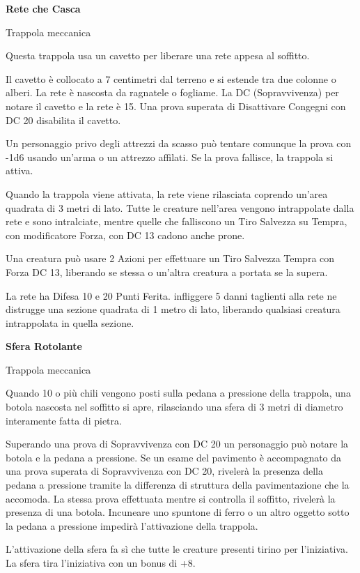 \begin{multicols}{2}
\medskip

\textbf{Rete che Casca}

Trappola meccanica

Questa trappola usa un cavetto per liberare una rete appesa al soffitto.

Il cavetto è collocato a 7 centimetri dal terreno e si estende tra due colonne o alberi. La rete è nascosta da ragnatele o fogliame. La DC (Sopravvivenza) per notare il cavetto e la rete è 15. Una prova superata di Disattivare Congegni con DC 20 disabilita il cavetto.

Un personaggio privo degli attrezzi da scasso può tentare comunque la prova con -1d6 usando un'arma o un attrezzo affilati. Se la prova fallisce, la trappola si attiva.

Quando la trappola viene attivata, la rete viene rilasciata coprendo un'area quadrata di 3 metri di lato. Tutte le creature nell'area vengono intrappolate dalla rete e sono intralciate, mentre quelle che falliscono un Tiro Salvezza su Tempra, con modificatore Forza, con DC 13 cadono anche prone.

Una creatura può usare 2 Azioni per effettuare un Tiro Salvezza Tempra con Forza DC 13, liberando se stessa o un'altra creatura a portata se la supera.

La rete ha Difesa 10 e 20 Punti Ferita. infliggere 5 danni taglienti alla rete ne distrugge una sezione quadrata di 1 metro di lato, liberando qualsiasi creatura intrappolata in quella sezione.

\medskip

\textbf{Sfera Rotolante}

Trappola meccanica

Quando 10 o più chili vengono posti sulla pedana a pressione della trappola, una botola nascosta nel soffitto si apre, rilasciando una sfera di 3 metri di diametro interamente fatta di pietra.

Superando una prova di Sopravvivenza con DC 20 un personaggio può notare la botola e la pedana a pressione. Se un esame del pavimento è accompagnato da una prova superata di Sopravvivenza con DC 20, rivelerà la presenza della pedana a pressione tramite la differenza di struttura della pavimentazione che la accomoda. La stessa prova effettuata mentre si controlla il soffitto, rivelerà la presenza di una botola. Incuneare uno spuntone di ferro o un altro oggetto sotto la pedana a pressione impedirà l'attivazione della trappola.

L'attivazione della sfera fa sì che tutte le creature presenti tirino per l'iniziativa. La sfera tira l'iniziativa con un bonus di +8.


\end{multicols}

